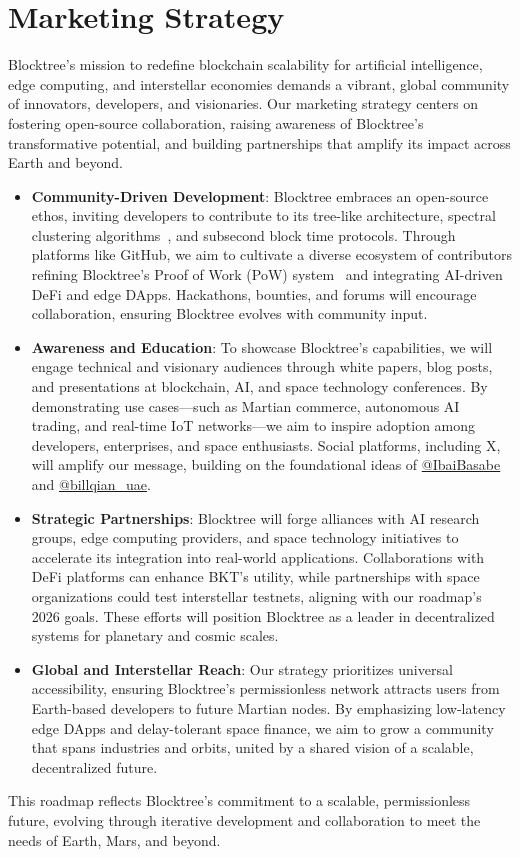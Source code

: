 \section{Marketing Strategy}
Blocktree’s mission to redefine blockchain scalability for artificial intelligence, edge computing, and interstellar economies demands a vibrant, global community of innovators, developers, and visionaries. Our marketing strategy centers on fostering open-source collaboration, raising awareness of Blocktree’s transformative potential, and building partnerships that amplify its impact across Earth and beyond.

\begin{itemize}
    \item \textbf{Community-Driven Development}: Blocktree embraces an open-source ethos, inviting developers to contribute to its tree-like architecture, spectral clustering algorithms~\cite{ng2001spectral}, and subsecond block time protocols. Through platforms like GitHub, we aim to cultivate a diverse ecosystem of contributors refining Blocktree’s Proof of Work (PoW) system~\cite{nakamoto2008bitcoin} and integrating AI-driven DeFi and edge DApps. Hackathons, bounties, and forums will encourage collaboration, ensuring Blocktree evolves with community input.

    \item \textbf{Awareness and Education}: To showcase Blocktree’s capabilities, we will engage technical and visionary audiences through white papers, blog posts, and presentations at blockchain, AI, and space technology conferences. By demonstrating use cases—such as Martian commerce, autonomous AI trading, and real-time IoT networks—we aim to inspire adoption among developers, enterprises, and space enthusiasts. Social platforms, including X, will amplify our message, building on the foundational ideas of \href{https://x.com/IbaiBasabe}{@IbaiBasabe} and \href{https://x.com/billqian\_uae}{@billqian\_uae}.

    \item \textbf{Strategic Partnerships}: Blocktree will forge alliances with AI research groups, edge computing providers, and space technology initiatives to accelerate its integration into real-world applications. Collaborations with DeFi platforms can enhance BKT’s utility, while partnerships with space organizations could test interstellar testnets, aligning with our roadmap’s 2026 goals. These efforts will position Blocktree as a leader in decentralized systems for planetary and cosmic scales.

    \item \textbf{Global and Interstellar Reach}: Our strategy prioritizes universal accessibility, ensuring Blocktree’s permissionless network attracts users from Earth-based developers to future Martian nodes. By emphasizing low-latency edge DApps and delay-tolerant space finance, we aim to grow a community that spans industries and orbits, united by a shared vision of a scalable, decentralized future.
\end{itemize}

This roadmap reflects Blocktree’s commitment to a scalable, permissionless future, evolving through iterative development and collaboration to meet the needs of Earth, Mars, and beyond.